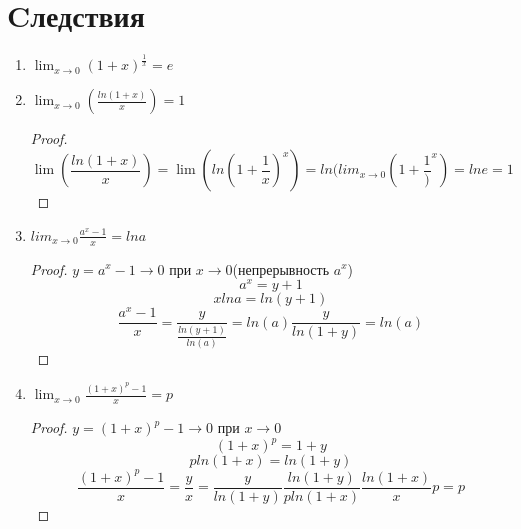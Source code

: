﻿\section{Cледствия}          
\begin{conseq}{}
\begin{enumerate}
 \item $\lim_{x \to 0}(1 + x)^{\frac1x} = e$
 \item $\lim_{x \to 0}(\frac{ln(1 + x)}{x}) = 1$
 \begin{proof}
    $$\lim(\frac{ln(1 + x)}x) =  \lim(ln(1 + \frac1x)^x) = ln(lim_{x \to 0}(1 + \frac1)^x) = ln e = 1$$
 \end{proof}
 \item $lim_{x \to 0}\frac{a^x - 1}{x} = ln a$
 \begin{proof}
    $y = a^x - 1 \to 0$ при $x \to 0$(непрерывность $a^x$)
    $$a^x = y + 1$$
    $$x ln a = ln (y + 1) $$
    $$\frac{a^x - 1}{x} = \frac{y}{\frac{ln(y+ 1)}{ln(a)}} = ln(a)\frac{y}{ln(1 + y)} = ln(a)$$
 \end{proof}
 \item $\lim_{x \to 0}\frac{(1 + x)^p - 1}{x} = p$
 \begin{proof}
     $y = (1 + x)^p - 1 \to 0$ при $x \to 0$
     $$(1 + x)^p = 1 + y$$
     $$p ln(1 + x) = ln(1 + y)$$
     $$\frac{(1 + x)^p - 1}{x} = \frac{y}{x} = \frac{y}{ln(1 + y)}\frac{ln(1 + y)}{p ln(1 + x)}\frac{ln(1 + x)}{x} p = p $$
 \end{proof}
\end{enumerate}
\end{conseq}